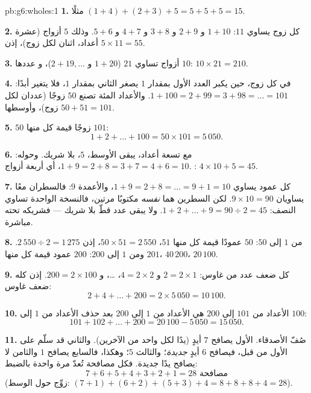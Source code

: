 \begin{solution}{pb:g6:wholes:1}
\textbf{1.} مثلًا $(1 + 4) + (2 + 3) + 5 = 5 + 5 + 5 =
15$.

\textbf{2.} كل زوج يساوي $11$: $1 + 10$ و $2 + 9$ و $3 + 8$
و $4 + 7$ و $5 + 6$. وذلك $5$ أزواج (عشرة أعداد، اثنان لكل زوج)،
إذن  $5 \times 11 = 55$.

\textbf{3.} أزواج تساوي $21$ ($1 + 20$ و $2 + 19, \dots$)، و
عددها $10$: $10 \times 21 = 210$.

\textbf{4.} في كل زوج، حين يكبر العدد الأول بمقدار $1$ يصغر
الثاني بمقدار $1$، فلا يتغير  أبدًا:
$1 + 100 = 2 + 99 = 3 + 98 = \dots = 101$. والأعداد المئة
تصنع $50$ زوجًا (عددان لكل زوج)، وأوسطها
$50 + 51 = 101$.

\textbf{5.} $50$ زوجًا قيمة كل منها $101$:
\[
1 + 2 + \dots + 100 = 50 \times 101 = 5\,050 .
\]

\textbf{6.} مع تسعة أعداد، يبقى الأوسط، $5$، بلا
شريك. وحوله: $1 + 9 = 2 + 8 = 3 + 7 = 4 + 6 = 10$، أي أربعة
أزواج. : $4 \times 10 + 5 = 45$.

\textbf{7.} كل عمود يساوي $1 + 9 = 2 + 8 = \dots =
9 + 1 = 10$، والأعمدة $9$: فالسطران معًا
يساويان $9 \times 10 = 90$. لكن السطرين هما 
\emph{نفسه} مكتوبًا مرتين، فالنسخة الواحدة تساوي النصف:
$1 + 2 + \dots + 9 = 90 \div 2 = 45$. ولا يبقى عدد قطّ
بلا شريك --- فشريكه تحته مباشرة.

\textbf{8.} من $1$ إلى $50$: $50$ عمودًا قيمة كل منها $51$، 
 $50 \times 51 = 2\,550$، إذن  $2\,550 \div 2 = 1\,275$.
ومن $1$ إلى $200$: $200$ عمود قيمة كل منها $201$،  
$40\,200$،  $20\,100$.

\textbf{9.} كل  ضعف عدد من
 غاوس: $2 = 2 \times 1$ و $4 = 2 \times 2$، \dots،
و $200 = 2 \times 100$. إذن  كله ضعف  غاوس:
\[
2 + 4 + \dots + 200 = 2 \times 5\,050 = 10\,100 .
\]

\textbf{10.} الأعداد من $101$ إلى $200$ هي الأعداد من
$1$ إلى $200$ بعد حذف الأعداد من $1$ إلى $100$:
\[
101 + 102 + \dots + 200 = 20\,100 - 5\,050 = 15\,050 .
\]

\textbf{11.} صُفّ الأصدقاء. الأول يصافح $7$ أيدٍ (يدًا
لكل واحد من الآخرين). والثاني قد سلّم على الأول من
قبل، فيصافح $6$ أيدٍ \emph{جديدة}؛ والثالث $5$؛ وهكذا،
فالسابع يصافح $1$ والثامن لا يصافح يدًا جديدة.
فكل مصافحة تُعدّ مرة واحدة بالضبط:
\[
7 + 6 + 5 + 4 + 3 + 2 + 1 = 28 \text{ مصافحة}
\]
(زوِّج حول الوسط: $(7+1) + (6+2) + (5+3) + 4 =
8 + 8 + 8 + 4 = 28$).


\end{solution}
